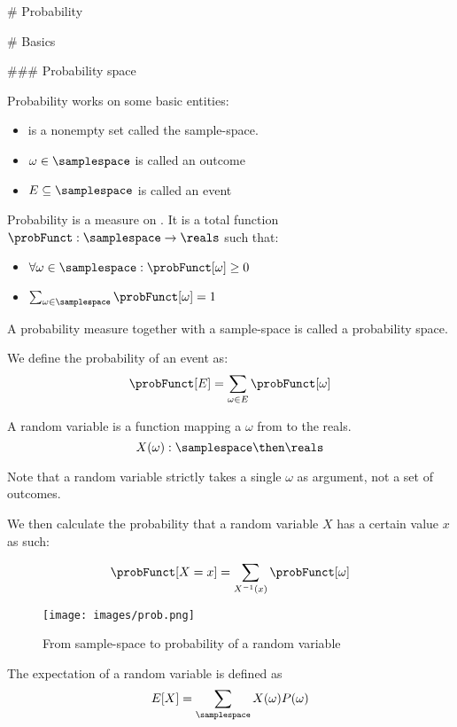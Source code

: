# Probability

# Basics

### Probability space

Probability works on some basic entities:
\begin{itemize}
    \item \samplespace is a nonempty set called the sample-space. 
    \item $\omega \in \samplespace$ is called an outcome
    \item $E \subseteq \samplespace$ is called an event
\end{itemize}


\begin{definition}[Probability]
    Probability is a measure on \samplespace. It is a total function $ \probFunct: \samplespace \to \reals $ such that:
    \begin{itemize}
        \item $ \forall \omega \in \samplespace : \probFunct[\omega] \geq 0 $
        \item $ \sum_{\omega \in \samplespace} \probFunct[\omega] = 1 $
    \end{itemize}
\end{definition}

A probability measure together with a sample-space is called a probability space. 


We define the probability of an event as: 
$$ \probFunct[E] = \sum_{\omega \in E} \probFunct[\omega] $$

\begin{definition}
    A random variable is a function mapping a $\omega$ from \samplespace  to the reals. 
    $$ X(\omega) : \samplespace \then \reals $$
\end{definition}
Note that a random variable strictly takes a single $\omega$ as argument, not a set of outcomes. 

We then calculate the probability that a random variable $X$ has a certain value $x$ as such: 

$$ \probFunct[X=x] = \sum_{X^{-1}(x)} \probFunct[\omega] $$


\begin{figure}[H]
    \caption{From sample-space to probability of a random variable}
    \centering
      \texttt{[image: images/prob.png]}
\end{figure}


\begin{definition}[Expectation]
    The expectation of a random variable is defined as 
    $$ E[X] = \sum_\samplespace X(\omega)P(\omega)$$ 
\end{definition}

